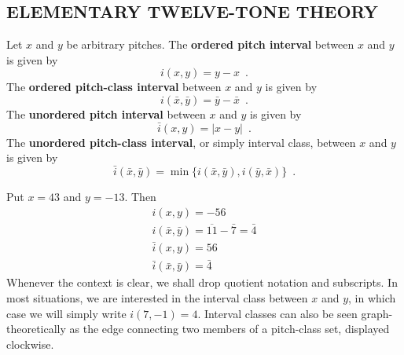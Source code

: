 \chapter{}

\section{ELEMENTARY TWELVE-TONE THEORY}


\begin{definition}
	Let $x$ and $y$ be arbitrary pitches. The \textbf{ordered pitch interval} between
	$x$ and $y$ is given by
	\begin{equation}
		i(x, y) = y - x \enspace.
	\end{equation}
	The \textbf{ordered pitch-class interval} between $x$ and $y$ is given by
	\begin{equation}
		i(\bar{x}, \bar{y}) = \bar{y} - \bar{x} \enspace.
	\end{equation}
	The \textbf{unordered pitch interval} between $x$ and $y$ is given by
	\begin{equation}
		\bar{i}(x, y) = |x - y| \enspace.
	\end{equation}
	The \textbf{unordered pitch-class interval}, or simply interval class, between
	$x$ and $y$ is given by
	\begin{equation}
		\bar{i}(\bar{x}, \bar{y}) = \min\{i(\bar{x}, \bar{y}), i(\bar{y}, \bar{x})\} \enspace.
	\end{equation}
\end{definition}

\begin{example}
	Put $x = 43$ and $y = -13$. Then
	\begin{gather}
		i(x, y) = -56 \\
		i(\bar{x}, \bar{y}) = \overline{11} - \bar{7} = \bar{4} \\
		\bar{i}(x, y) = 56 \\
		\bar{i}(\bar{x}, \bar{y}) = \bar{4}
	\end{gather}
	Whenever the context is clear, we shall drop quotient notation and subscripts.
	In most situations, we are interested in the interval class between $x$ and $y$,
	in which case we will simply write $i(7, -1) = 4$. Interval classes can also be
	seen graph-theoretically as the edge connecting two members of a pitch-class set,
	displayed clockwise.
\end{example}

